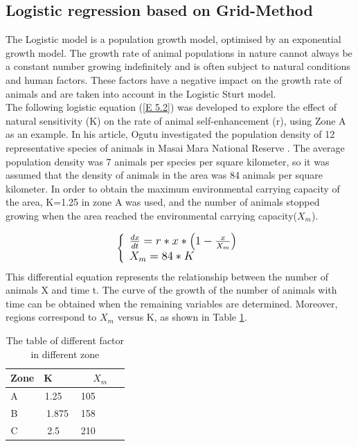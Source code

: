 \documentclass{mcmthesis}
\numberwithin{figure}{section}
\numberwithin{table}{section}
\numberwithin{equation}{section}
\begin{document}
\subsection{Logistic regression based on Grid-Method}
The Logistic model is a population growth model, optimised by an exponential growth model. The growth rate of animal populations in nature cannot always be a constant number growing indefinitely and is often subject to natural conditions and human factors. These factors have a negative impact on the growth rate of animals and are taken into account in the Logistic Sturt model.
\\
The following logistic equation (\ref{E 5.2}) was developed to explore the effect of natural sensitivity (K) on the rate of animal self-enhancement (r), using Zone A as an example. In his article, Ogutu investigated the population density of 12 representative species of animals in Masai Mara National Reserve \cite{3} . The average population density was 7 animals per species per square kilometer, so it was assumed that the density of animals in the area was 84 animals per square kilometer. In order to obtain the maximum environmental carrying capacity of the area, K=1.25 in zone A was used, and the number of animals stopped growing when the area reached the environmental carrying capacity($X_m$).

\begin{equation}
	\large{
		\left\{ \begin{array}{l}
			\frac{dx}{dt}=r*x*\left( 1-\frac{x}{X_m} \right)\\
			X_m=84*K\\
		\end{array} \right.} 
	\label{E 5.2}
\end{equation}
This differential equation represents the relationship between the number of animals X and time t. The curve of the growth of the number of animals with time can be obtained when the remaining variables are determined. Moreover, regions correspond to $X_m$ versus K, as shown in Table \ref{T 5.2}.

\begin{table}[thb]
	\normalsize
	\renewcommand\arraystretch{1.07}
	\centering
	\caption{The table of different factor in different zone}
	\label{T 5.2}
	\setlength{\tabcolsep}{14mm}
	\begin{tabular}{ccc}
		\hline
		Zone & K     & $X_m$ \\ \hline
		A     & 1.25  & 105      \\
		B     & 1.875 & 158      \\
		C     & 2.5   & 210      \\ \hline
	\end{tabular}
\end{table}
\end{document}
